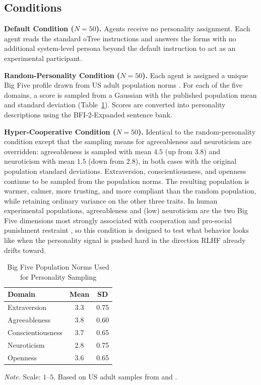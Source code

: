 \documentclass[12pt, a4paper]{article}
\begin{document}
\subsection{Conditions}

\textbf{Default Condition ($N=50$).} Agents receive no personality assignment. Each agent reads the standard oTree instructions and answers the forms with no additional system-level persona beyond the default instruction to act as an experimental participant.

\textbf{Random-Personality Condition ($N=50$).} Each agent is assigned a unique Big Five profile drawn from US adult population norms \citep{soto2017bfi2, srivastava2003development}. For each of the five domains, a score is sampled from a Gaussian with the published population mean and standard deviation (Table~\ref{tab:norms}). Scores are converted into personality descriptions using the BFI-2-Expanded sentence bank.

\textbf{Hyper-Cooperative Condition ($N=50$).} Identical to the random-personality condition except that the sampling means for agreeableness and neuroticism are overridden: agreeableness is sampled with mean $4.5$ (up from $3.8$) and neuroticism with mean $1.5$ (down from $2.8$), in both cases with the original population standard deviations. Extraversion, conscientiousness, and openness continue to be sampled from the population norms. The resulting population is warmer, calmer, more trusting, and more compliant than the random population, while retaining ordinary variance on the other three traits. In human experimental populations, agreeableness and (low) neuroticism are the two Big Five dimensions most strongly associated with cooperation and pro-social punishment restraint \citep{volk2012personality}, so this condition is designed to test what behavior looks like when the personality signal is pushed hard in the direction RLHF already drifts toward.

\begin{table}[H]
\centering
\caption{Big Five Population Norms Used for Personality Sampling}
\label{tab:norms}
\begin{tabular}{lcc}
\toprule
Domain & Mean & SD \\
\midrule
Extraversion      & 3.3 & 0.75 \\
Agreeableness     & 3.8 & 0.60 \\
Conscientiousness & 3.7 & 0.65 \\
Neuroticism       & 2.8 & 0.75 \\
Openness          & 3.6 & 0.65 \\
\bottomrule
\end{tabular}

\medskip
\footnotesize
\textit{Note.} Scale: $1$--$5$. Based on US adult samples from \citet{soto2017bfi2} and \citet{srivastava2003development}.
\end{table}
\end{document}
